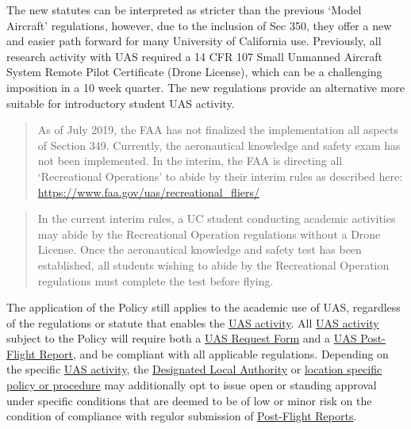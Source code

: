 \documentclass[
]{book}
\begin{document}
The new statutes can be interpreted as stricter than the previous `Model Aircraft' regulations, however, due to the inclusion of Sec 350, they offer a new and easier path forward for many University of California use. Previously, all research activity with UAS required a 14 CFR 107 Small Unmanned Aircraft System Remote Pilot Certificate (Drone License), which can be a challenging imposition in a 10 week quarter. The new regulations provide an alternative more suitable for introductory student UAS activity.

\begin{quote}
As of July 2019, the FAA has not finalized the implementation all aspects of Section 349. Currently, the aeronautical knowledge and safety exam has not been implemented. In the interim, the FAA is directing all `Recreational Operations' to abide by their interim rules as described here: \url{https://www.faa.gov/uas/recreational_fliers/}
\end{quote}

\begin{quote}
In the current interim rules, a UC student conducting academic activities may abide by the Recreational Operation regulations without a Drone License. Once the aeronautical knowledge and safety test has been established, all students wishing to abide by the Recreational Operation regulations must complete the test before flying.
\end{quote}

The application of the Policy still applies to the academic use of UAS, regardless of the regulations or statute that enables the \protect\hyperlink{UASactivity}{UAS activity}. All \protect\hyperlink{UASactivity}{UAS activity} subject to the Policy will require both a \protect\hyperlink{FR}{UAS Request Form} and a \protect\hyperlink{postflight}{UAS Post-Flight Report}, and be compliant with all applicable regulations. Depending on the specific \protect\hyperlink{UASactivity}{UAS activity}, the \protect\hyperlink{DLA}{Designated Local Authority} or \protect\hyperlink{LSP}{location specific policy or procedure} may additionally opt to issue open or standing approval under specific conditions that are deemed to be of low or minor risk on the condition of compliance with regulor submission of \protect\hyperlink{postflight}{Post-Flight Reports}.
\end{document}
